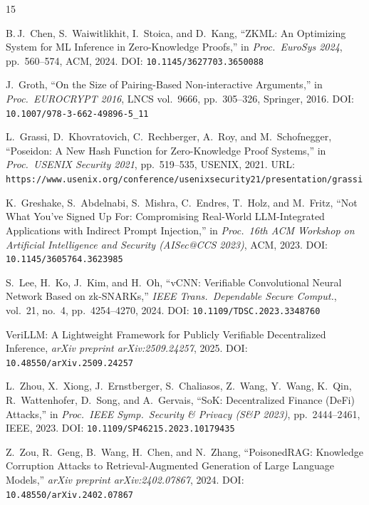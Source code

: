 \documentclass[final,5p,times,twocolumn]{elsarticle}
\theoremstyle{plain}
\theoremstyle{definition}
\theoremstyle{remark}
\begin{document}
\begin{thebibliography}{15}

B.\,J.\ Chen, S.\ Waiwitlikhit, I.\ Stoica, and D.\ Kang,
``ZKML: An Optimizing System for ML Inference in Zero-Knowledge Proofs,''
in \textit{Proc.\ EuroSys 2024}, pp.\ 560--574, ACM, 2024.
\newblock DOI: \texttt{10.1145/3627703.3650088}

J.\ Groth,
``On the Size of Pairing-Based Non-interactive Arguments,''
in \textit{Proc.\ EUROCRYPT 2016}, LNCS vol.\ 9666, pp.\ 305--326,
Springer, 2016.
\newblock DOI: \texttt{10.1007/978-3-662-49896-5\_11}

L.\ Grassi, D.\ Khovratovich, C.\ Rechberger, A.\ Roy, and M.\ Schofnegger,
``Poseidon: A New Hash Function for Zero-Knowledge Proof Systems,''
in \textit{Proc.\ USENIX Security 2021}, pp.\ 519--535, USENIX, 2021.
\newblock URL: \texttt{https://www.usenix.org/conference/usenixsecurity21/presentation/grassi}

K.\ Greshake, S.\ Abdelnabi, S.\ Mishra, C.\ Endres, T.\ Holz, and M.\ Fritz,
``Not What You've Signed Up For: Compromising Real-World LLM-Integrated
Applications with Indirect Prompt Injection,''
in \textit{Proc.\ 16th ACM Workshop on Artificial Intelligence and Security
(AISec@CCS 2023)}, ACM, 2023.
\newblock DOI: \texttt{10.1145/3605764.3623985}

S.\ Lee, H.\ Ko, J.\ Kim, and H.\ Oh,
``vCNN: Verifiable Convolutional Neural Network Based on zk-SNARKs,''
\textit{IEEE Trans.\ Dependable Secure Comput.}, vol.\ 21, no.\ 4,
pp.\ 4254--4270, 2024.
\newblock DOI: \texttt{10.1109/TDSC.2023.3348760}

VeriLLM: A Lightweight Framework for Publicly Verifiable Decentralized Inference,
\textit{arXiv preprint arXiv:2509.24257}, 2025.
\newblock DOI: \texttt{10.48550/arXiv.2509.24257}

L.\ Zhou, X.\ Xiong, J.\ Ernstberger, S.\ Chaliasos, Z.\ Wang, Y.\ Wang,
K.\ Qin, R.\ Wattenhofer, D.\ Song, and A.\ Gervais,
``SoK: Decentralized Finance (DeFi) Attacks,''
in \textit{Proc.\ IEEE Symp.\ Security \& Privacy (S\&P 2023)},
pp.\ 2444--2461, IEEE, 2023.
\newblock DOI: \texttt{10.1109/SP46215.2023.10179435}

Z.\ Zou, R.\ Geng, B.\ Wang, H.\ Chen, and N.\ Zhang,
``PoisonedRAG: Knowledge Corruption Attacks to Retrieval-Augmented Generation
of Large Language Models,''
\textit{arXiv preprint arXiv:2402.07867}, 2024.
\newblock DOI: \texttt{10.48550/arXiv.2402.07867}


\end{thebibliography}
\end{document}
